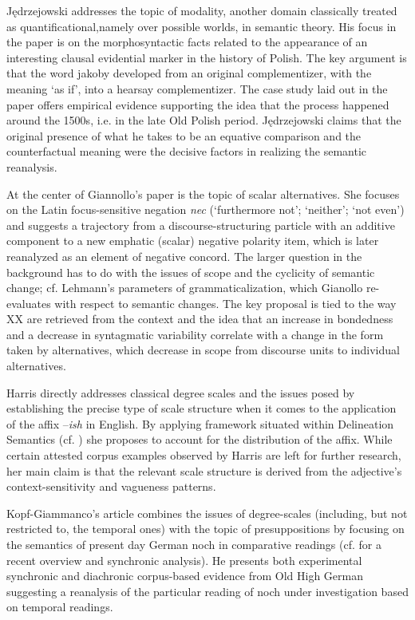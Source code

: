 \documentclass[output=paper]{langsci/langscibook}
\begin{document}
Jędrzejowski addresses the topic of modality, another domain classically\linebreak 
treated as quantificational,namely over possible worlds, in semantic theory. His focus in the paper is on the morphosyntactic facts related to the appearance of an interesting clausal evidential marker in the history of Polish.  The key argument is that the word jakoby developed from an original complementizer, with the meaning ‘as if’, into a hearsay complementizer. The case study laid out in the paper offers empirical evidence supporting the idea that the process happened around the 1500s, i.e. in the late Old Polish period. Jędrzejowski claims that the original presence of what he takes to be an equative comparison and the counterfactual meaning were the decisive factors in realizing the semantic reanalysis.

At the center of Giannollo’s paper is the topic of scalar alternatives. She focuses on the Latin focus-sensitive negation \textit{nec} (`furthermore not'; `neither'; `not even') and suggests a trajectory from a discourse-structuring particle with an additive component to a new emphatic (scalar) negative polarity item, which is later reanalyzed as an element of negative concord. The larger question in the background has to do with the issues of scope and the cyclicity of semantic change; cf. Lehmann’s parameters of grammaticalization, which Gianollo re-evaluates with respect to semantic changes. The key proposal is tied to the way XX are retrieved from the context and the idea that an increase in bondedness and a decrease in syntagmatic variability correlate with a change in the form taken by alternatives, which decrease in scope from discourse units to individual alternatives.

Harris directly addresses classical degree scales and the issues posed by establishing the precise type of scale structure when it comes to the application of the affix –\textit{ish} in English. By applying  framework situated within Delineation Semantics (cf. \citealt{Cobreros2012}) she proposes to account for the distribution of the affix. While certain attested corpus examples observed by Harris are left for further research, her main claim is that the relevant scale structure is derived from the adjective’s context-sensitivity and vagueness patterns.

Kopf-Giammanco’s article combines the issues of degree-scales (including, but not restricted to, the temporal ones) with the topic of presuppositions by focusing on the semantics of present day German noch in comparative readings (cf. \citealt{Beck2019} for a recent overview and synchronic analysis). He presents both experimental synchronic and diachronic corpus-based evidence from Old High German suggesting a reanalysis of the particular reading of noch under investigation based on temporal readings.
\end{document}

